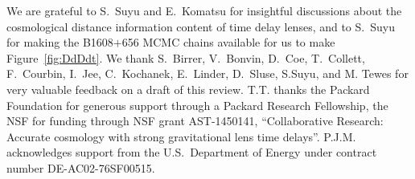 %
%


\begin{acknowledgements}
We are grateful to S.~Suyu and E.~Komatsu for insightful discussions
about the cosmological distance information content of time delay
lenses, and to S.~Suyu for making the B1608$+$656 MCMC chains
available for us to make Figure~\ref{fig:DdDdt}.
%
We thank S.~Birrer, V.~Bonvin, D.~Coe, T.~Collett, F.~Courbin, I.~Jee,
C.~Kochanek, E.~Linder, D.~Sluse, S.Suyu, and M. Tewes for very
valuable feedback on a draft of this review.
%
T.T. thanks the Packard Foundation for generous support through a
Packard Research Fellowship, the NSF for funding through NSF grant
AST-1450141, ``Collaborative Research: Accurate cosmology with strong
gravitational lens time delays''.
%
P.J.M. acknowledges support from the U.S.\ Department of Energy under
contract number DE-AC02-76SF00515.
\end{acknowledgements}

